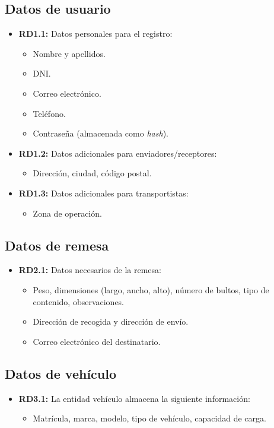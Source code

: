 \subsection{Datos de usuario}
\begin{itemize}
  \item \textbf{RD1.1:} Datos personales para el registro:
  \begin{itemize}
    \item Nombre y apellidos.
    \item DNI.
    \item Correo electrónico.
    \item Teléfono.
    \item Contraseña (almacenada como \textit{hash}).
  \end{itemize}
  \item \textbf{RD1.2:} Datos adicionales para enviadores/receptores:
  \begin{itemize}
    \item Dirección, ciudad, código postal.
  \end{itemize}
  \item \textbf{RD1.3:} Datos adicionales para transportistas:
  \begin{itemize}
    \item Zona de operación.
  \end{itemize}
\end{itemize}

\subsection{Datos de remesa}
\begin{itemize}
  \item \textbf{RD2.1:} Datos necesarios de la remesa:
  \begin{itemize}
    \item Peso, dimensiones (largo, ancho, alto), número de bultos, tipo de contenido, observaciones.
    \item Dirección de recogida y dirección de envío.
    \item Correo electrónico del destinatario.
  \end{itemize}
\end{itemize}


\subsection{Datos de vehículo}
\begin{itemize}
    \item \textbf{RD3.1:} La entidad vehículo almacena la siguiente información:
    \begin{itemize}
        \item Matrícula, marca, modelo, tipo de vehículo, capacidad de carga.
    \end{itemize}
\end{itemize}





